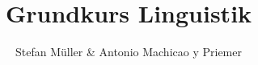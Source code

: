 \title{Grundkurs Linguistik}


\author{Stefan Müller \& Antonio Machicao y Priemer}

\huberlintitlepage
